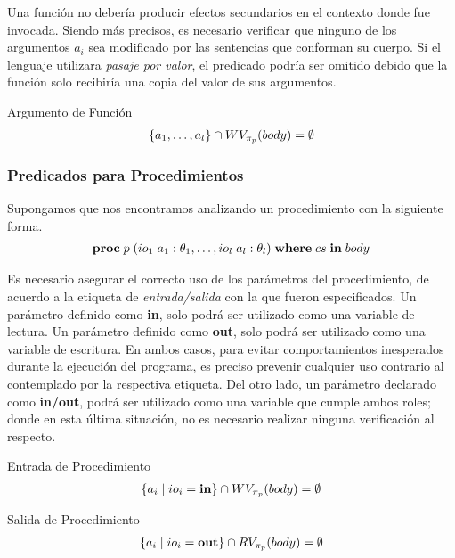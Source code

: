 Una función no debería producir efectos secundarios en el contexto donde fue invocada.
Siendo más precisos, es necesario verificar que ninguno de los argumentos $a_i$ sea modificado por las sentencias que conforman su cuerpo.
Si el lenguaje utilizara \textit{pasaje por valor}, el predicado podría ser omitido debido que la función solo recibiría una copia del valor de sus argumentos.

\begin{Predicado}
\label{PFArgumento}
Argumento de Función
\begin{gather*}
\{ a_1, \ldots, a_l \} \cap WV_{\pi_{p}}(body) = \emptyset
\end{gather*}
\end{Predicado}

\subsubsection{Predicados para Procedimientos}

Supongamos que nos encontramos analizando un procedimiento con la siguiente forma.
\begin{gather*}
\mathbf{proc} \; p \; (io_1 \; a_1: \theta_1, \ldots, io_l \; a_l: \theta_l) \; \mathbf{where} \; cs \; \mathbf{in} \; body
\end{gather*}

Es necesario asegurar el correcto uso de los parámetros del procedimiento, de acuerdo a la etiqueta de \textit{entrada/salida} con la que fueron especificados.
Un parámetro definido como \textbf{in}, solo podrá ser utilizado como una variable de lectura.
Un parámetro definido como \textbf{out}, solo podrá ser utilizado como una variable de escritura.
En ambos casos, para evitar comportamientos inesperados durante la ejecución del programa, es preciso prevenir cualquier uso contrario al contemplado por la respectiva etiqueta.
Del otro lado, un parámetro declarado como \textbf{in/out}, podrá ser utilizado como una variable que cumple ambos roles; donde en esta última situación, no es necesario realizar ninguna verificación al respecto.

\begin{Predicado}
\label{PPEntrada}
Entrada de Procedimiento
\begin{gather*}
\{ a_i \mid io_i = \mathbf{in} \} \cap WV_{\pi_{p}}(body) = \emptyset
\end{gather*}
\end{Predicado}

\begin{Predicado}
\label{PPSalida}
Salida de Procedimiento
\begin{gather*}
\{ a_i \mid io_i = \mathbf{out} \} \cap RV_{\pi_{p}}(body) = \emptyset
\end{gather*}
\end{Predicado}


